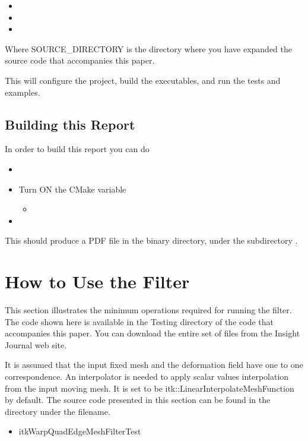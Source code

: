 \documentclass{InsightArticle}
\begin{document}
\begin{itemize}
\item {}
\item {}
\item {}
\end{itemize}

Where SOURCE\_DIRECTORY is the directory where you have expanded the source
code that accompanies this paper.

This will configure the project, build the executables, and run the tests and
examples. 


\subsection{Building this Report}

In order to build this report you can do

\begin{itemize}
\item {}
\item Turn ON the CMake variable
\begin{itemize}
\item {}
\end{itemize}
\item {}
\end{itemize}

This should produce a PDF file in the binary directory, under the subdirectory
.


\section{How to Use the Filter}

This section illustrates the minimum operations required for running the filter. The code shown here 
is available in the Testing directory of the code that accompanies this paper. You can download the 
entire set of files from the Insight Journal web site.

It is assumed that the input fixed mesh and the deformation field have one to one correspondence. 
An interpolator is needed to apply scalar values interpolation from the input moving mesh. 
It is set to be itk::LinearInterpolateMeshFunction by default. 
The source code presented in this section can be found in the  directory under the filename.

\begin{itemize}
\item itkWarpQuadEdgeMeshFilterTest
\end{itemize}
\end{document}
